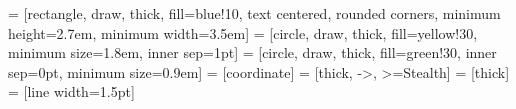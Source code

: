 \usepackage{placeins} %
\usepackage{graphicx} %
\graphicspath{{.}}    %
\usepackage{float}   %
\usepackage{rotating}
\usepackage{tikz}
\usepackage{svg} %
\usetikzlibrary{positioning, arrows.meta, plotmarks, arrows, shapes.geometric, calc, shapes, backgrounds, fit, patterns, shapes.multipart, decorations.pathreplacing, decorations.pathmorphing, decorations.text, shapes.symbols, shadows.blur, shadows} %
 = [rectangle, draw, thick, fill=blue!10, text centered, rounded corners, minimum height=2.7em, minimum width=3.5em]
 = [circle, draw, thick, fill=yellow!30, minimum size=1.8em, inner sep=1pt]
 = [circle, draw, thick, fill=green!30, inner sep=0pt, minimum size=0.9em] %
 = [coordinate] %
 = [thick, ->, >=Stealth]
 = [thick]
 = [line width=1.5pt] %
\usepackage{changepage}
\usepackage{amssymb} %
\newcommand{\ai}[1]{#1\textsuperscript{◊}}

\renewcommand{\topfraction}{0.9}    %
\renewcommand{\bottomfraction}{0.9} %
\renewcommand{\textfraction}{0.1}   %
\renewcommand{\floatpagefraction}{0.7} %

\setcounter{topnumber}{4}    %
\setcounter{bottomnumber}{4} %
\setcounter{totalnumber}{10} %

